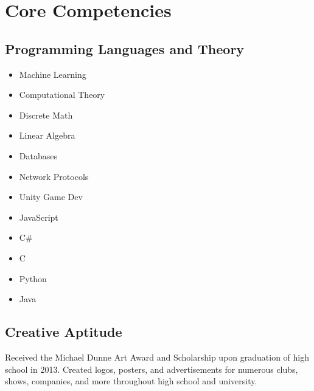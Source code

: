 \documentclass{my_cv}
\begin{document}
\section{Core Competencies}

\subsection{Programming Languages and Theory}
\begin{multicols}{4}
	\begin{itemize}
		\item Machine Learning 
		\item Computational Theory 
		\item Discrete Math
		\item Linear Algebra
		\item Databases
		\item Network Protocols
		\item Unity Game Dev
		\item JavaScript
		\item C\#
		\item C
		\item Python 
		\item Java 
	\end{itemize}
\end{multicols}


\subsection{Creative Aptitude}
	\workitems
	{Received the Michael Dunne Art Award and Scholarship upon graduation of high school in 2013.}
	{Created logos, posters, and advertisements for numerous clubs, shows, companies, and more throughout high school and university.}
\end{document}
